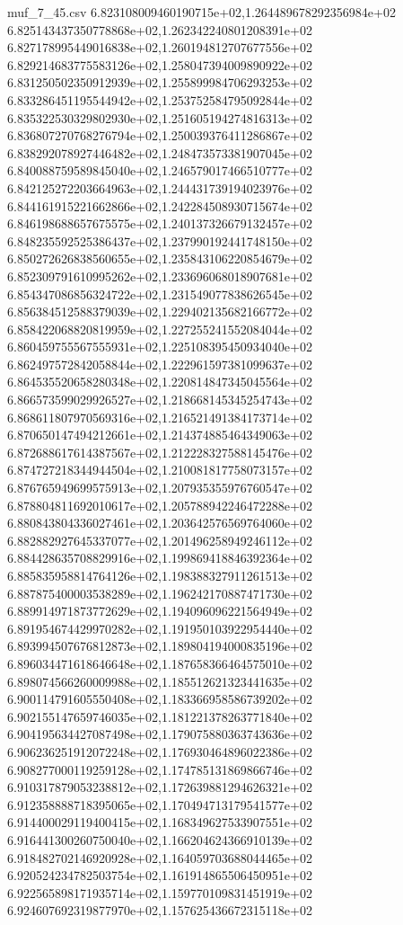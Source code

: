 \begin{filecontents*}{muf_7_45.csv}
6.823108009460190715e+02,1.264489678292356984e+02
6.825143437350778868e+02,1.262342240801208391e+02
6.827178995449016838e+02,1.260194812707677556e+02
6.829214683775583126e+02,1.258047394009890922e+02
6.831250502350912939e+02,1.255899984706293253e+02
6.833286451195544942e+02,1.253752584795092844e+02
6.835322530329802930e+02,1.251605194274816313e+02
6.836807270768276794e+02,1.250039376411286867e+02
6.838292078927446482e+02,1.248473573381907045e+02
6.840088759589845040e+02,1.246579017466510777e+02
6.842125272203664963e+02,1.244431739194023976e+02
6.844161915221662866e+02,1.242284508930715674e+02
6.846198688657675575e+02,1.240137326679132457e+02
6.848235592525386437e+02,1.237990192441748150e+02
6.850272626838560655e+02,1.235843106220854679e+02
6.852309791610995262e+02,1.233696068018907681e+02
6.854347086856324722e+02,1.231549077838626545e+02
6.856384512588379039e+02,1.229402135682166772e+02
6.858422068820819959e+02,1.227255241552084044e+02
6.860459755567555931e+02,1.225108395450934040e+02
6.862497572842058844e+02,1.222961597381099637e+02
6.864535520658280348e+02,1.220814847345045564e+02
6.866573599029926527e+02,1.218668145345254743e+02
6.868611807970569316e+02,1.216521491384173714e+02
6.870650147494212661e+02,1.214374885464349063e+02
6.872688617614387567e+02,1.212228327588145476e+02
6.874727218344944504e+02,1.210081817758073157e+02
6.876765949699575913e+02,1.207935355976760547e+02
6.878804811692010617e+02,1.205788942246472288e+02
6.880843804336027461e+02,1.203642576569764060e+02
6.882882927645337077e+02,1.201496258949246112e+02
6.884428635708829916e+02,1.199869418846392364e+02
6.885835958814764126e+02,1.198388327911261513e+02
6.887875400003538289e+02,1.196242170887471730e+02
6.889914971873772629e+02,1.194096096221564949e+02
6.891954674429970282e+02,1.191950103922954440e+02
6.893994507676812873e+02,1.189804194000835196e+02
6.896034471618646648e+02,1.187658366464575010e+02
6.898074566260009988e+02,1.185512621323441635e+02
6.900114791605550408e+02,1.183366958586739202e+02
6.902155147659746035e+02,1.181221378263771840e+02
6.904195634427087498e+02,1.179075880363743636e+02
6.906236251912072248e+02,1.176930464896022386e+02
6.908277000119259128e+02,1.174785131869866746e+02
6.910317879053238812e+02,1.172639881294626321e+02
6.912358888718395065e+02,1.170494713179541577e+02
6.914400029119400415e+02,1.168349627533907551e+02
6.916441300260750040e+02,1.166204624366910139e+02
6.918482702146920928e+02,1.164059703688044465e+02
6.920524234782503754e+02,1.161914865506450951e+02
6.922565898171935714e+02,1.159770109831451919e+02
6.924607692319877970e+02,1.157625436672315118e+02

\end{filecontents*}
